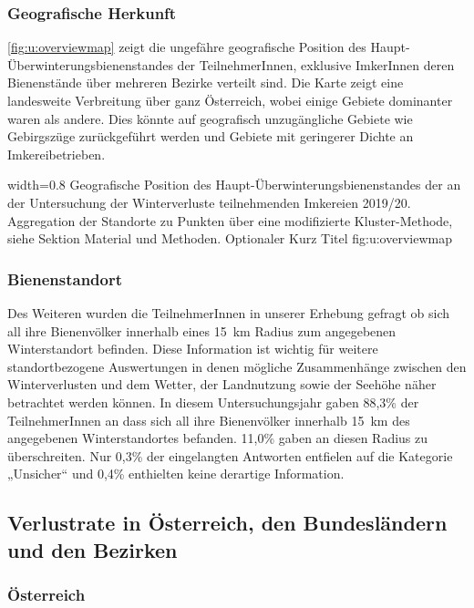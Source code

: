 \subsubsection{Geografische Herkunft}

\cref{fig:u:overviewmap} zeigt die ungefähre geografische Position des Haupt-Überwinterungsbienenstandes der TeilnehmerInnen, exklusive ImkerInnen deren Bienenstände über mehreren Bezirke verteilt sind. Die Karte zeigt eine landesweite Verbreitung über ganz Österreich, wobei einige Gebiete dominanter waren als andere. Dies könnte auf geografisch unzugängliche Gebiete wie Gebirgszüge zurückgeführt werden und Gebiete mit geringerer Dichte an Imkereibetrieben.

  {width=0.8\textwidth} %
  {Geografische Position des Haupt-Überwinterungsbienenstandes der an der Untersuchung der Winterverluste teilnehmenden Imkereien 2019/20. Aggregation der Standorte zu Punkten über eine modifizierte Kluster-Methode, siehe Sektion Material und Methoden.} %
  {Optionaler Kurz Titel} %
  {fig:u:overviewmap} %

\subsubsection{Bienenstandort}

Des Weiteren wurden die TeilnehmerInnen in unserer Erhebung gefragt ob sich all ihre Bienenvölker innerhalb eines \SI{15}{\kilo\meter} Radius zum angegebenen Winterstandort befinden. Diese Information ist wichtig für weitere standortbezogene Auswertungen in denen mögliche Zusammenhänge zwischen den Winterverlusten und dem Wetter, der Landnutzung sowie der Seehöhe näher betrachtet werden können.
\newline
In diesem Untersuchungsjahr gaben 88,3\% der TeilnehmerInnen an dass sich all ihre Bienenvölker innerhalb \SI{15}{\kilo\meter} des angegebenen Winterstandortes befanden. 11,0\% gaben an diesen Radius zu überschreiten. Nur 0,3\% der eingelangten Antworten entfielen auf die Kategorie „Unsicher`` und 0,4\% enthielten keine derartige Information.

\subsection{Verlustrate in Österreich, den Bundesländern und den Bezirken}
\subsubsection{Österreich}

